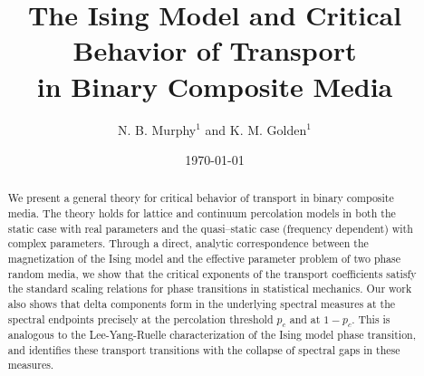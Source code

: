 \documentclass[english,12pt,jmp,graphicx]{revtex4-1}
\begin{document}

\title{The Ising Model
and Critical Behavior of Transport \\in Binary Composite Media} %



\author{N. B. Murphy$^1$ and K. M. Golden$^1$}
%


\date{\today}

\begin{abstract}
%
We present a general theory for critical behavior of transport in
binary composite media. The theory holds for lattice and continuum
percolation models in both the static case with real parameters and
the quasi--static case (frequency dependent) with complex
parameters. Through a direct, analytic correspondence between the
magnetization of the Ising model and the effective parameter problem
of two phase random media, we show that the critical exponents of the
transport coefficients satisfy the standard scaling relations for
phase transitions in statistical mechanics. Our work also shows that
delta components form in the underlying spectral measures at the
spectral endpoints precisely at the percolation threshold $p_c$ and at
$1-p_c$. This is analogous to the Lee-Yang-Ruelle characterization of
the Ising model phase transition, and identifies these transport
transitions with the collapse of spectral gaps in these measures. 
%
\end{abstract}
\end{document}
